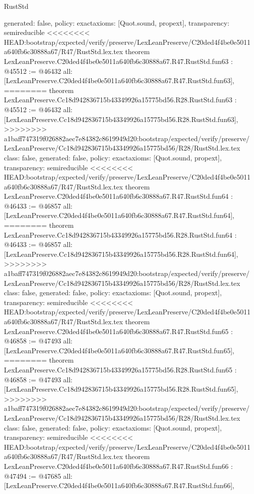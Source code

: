 \begin{lexlean}{RustStd}
\begin{coremodule}
{\begin{coremodule}
{{{{{{{{{{{{{{{{{{{{{{{{{{{{{{{{{{{{{{{{{{{{{{{{{{{{{{{{{{{{{{{{{{  generated: false,
  policy: exact{axioms: [Quot.sound, propext]},
  transparency: semireducible
}
<<<<<<<< HEAD:bootstrap/expected/verify/preserve/LexLeanPreserve/C20ded4f4be0e5011a640fb6c30888a67/R47/RustStd.lex.tex
theorem LexLeanPreserve.C20ded4f4be0e5011a640fb6c30888a67.R47.RustStd.fun63 : @45512 := @46432 {
  all: [LexLeanPreserve.C20ded4f4be0e5011a640fb6c30888a67.R47.RustStd.fun63],
========
theorem LexLeanPreserve.Cc18d942836715b43349926a15775bd56.R28.RustStd.fun63 : @45512 := @46432 {
  all: [LexLeanPreserve.Cc18d942836715b43349926a15775bd56.R28.RustStd.fun63],
>>>>>>>> a1baff747319f026882aec7e84382c8619949d20:bootstrap/expected/verify/preserve/LexLeanPreserve/Cc18d942836715b43349926a15775bd56/R28/RustStd.lex.tex
  class: false,
  generated: false,
  policy: exact{axioms: [Quot.sound, propext]},
  transparency: semireducible
}
<<<<<<<< HEAD:bootstrap/expected/verify/preserve/LexLeanPreserve/C20ded4f4be0e5011a640fb6c30888a67/R47/RustStd.lex.tex
theorem LexLeanPreserve.C20ded4f4be0e5011a640fb6c30888a67.R47.RustStd.fun64 : @46433 := @46857 {
  all: [LexLeanPreserve.C20ded4f4be0e5011a640fb6c30888a67.R47.RustStd.fun64],
========
theorem LexLeanPreserve.Cc18d942836715b43349926a15775bd56.R28.RustStd.fun64 : @46433 := @46857 {
  all: [LexLeanPreserve.Cc18d942836715b43349926a15775bd56.R28.RustStd.fun64],
>>>>>>>> a1baff747319f026882aec7e84382c8619949d20:bootstrap/expected/verify/preserve/LexLeanPreserve/Cc18d942836715b43349926a15775bd56/R28/RustStd.lex.tex
  class: false,
  generated: false,
  policy: exact{axioms: [Quot.sound, propext]},
  transparency: semireducible
}
<<<<<<<< HEAD:bootstrap/expected/verify/preserve/LexLeanPreserve/C20ded4f4be0e5011a640fb6c30888a67/R47/RustStd.lex.tex
theorem LexLeanPreserve.C20ded4f4be0e5011a640fb6c30888a67.R47.RustStd.fun65 : @46858 := @47493 {
  all: [LexLeanPreserve.C20ded4f4be0e5011a640fb6c30888a67.R47.RustStd.fun65],
========
theorem LexLeanPreserve.Cc18d942836715b43349926a15775bd56.R28.RustStd.fun65 : @46858 := @47493 {
  all: [LexLeanPreserve.Cc18d942836715b43349926a15775bd56.R28.RustStd.fun65],
>>>>>>>> a1baff747319f026882aec7e84382c8619949d20:bootstrap/expected/verify/preserve/LexLeanPreserve/Cc18d942836715b43349926a15775bd56/R28/RustStd.lex.tex
  class: false,
  generated: false,
  policy: exact{axioms: [Quot.sound, propext]},
  transparency: semireducible
}
<<<<<<<< HEAD:bootstrap/expected/verify/preserve/LexLeanPreserve/C20ded4f4be0e5011a640fb6c30888a67/R47/RustStd.lex.tex
theorem LexLeanPreserve.C20ded4f4be0e5011a640fb6c30888a67.R47.RustStd.fun66 : @47494 := @47685 {
  all: [LexLeanPreserve.C20ded4f4be0e5011a640fb6c30888a67.R47.RustStd.fun66],
}}}}}}}}}}}}}}}}}}}}}}}}}}}}}}}}}}}}}}}}}}}}}}}}}}}}}}}}}}}}}}}}}}}}}
\end{coremodule}}
\end{coremodule}
\end{lexlean}
